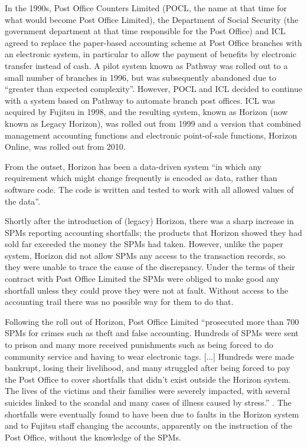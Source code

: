 In the 1990s, Post Office Counters Limited (POCL, the name at that time for what would become Post Office Limited), the Department of Social Security (the government department at that time responsible for the Post Office) and ICL agreed to replace the paper-based accounting scheme at Post Office branches with an electronic system, in particular to allow the payment of benefits by electronic transfer instead of cash. A pilot system known as Pathway was rolled out to a small number of branches in 1996, but was subsequently abandoned due to ``greater than expected complexity''. However, POCL and ICL decided to continue with a system based on Pathway to automate branch post offices. ICL was acquired by Fujitsu in 1998, and the resulting system, known as Horizon (now known as Legacy Horizon), was rolled out from 1999 and a version that combined management accounting functions and electronic point-of-sale functions, Horizon Online, was rolled out from 2010.

From the outset, Horizon has been a \gls{data-driven system} ``in which any requirement which
might change frequently is encoded as data, rather than software code. The code is
written and tested to work with all allowed values of the data''\cite{citation:bates_v_pol_tech}. 

Shortly after the introduction of (legacy) Horizon, there was a sharp increase in SPMs reporting accounting shortfalls; the products that Horizon showed they had sold far exceeded the money the SPMs had taken. However, unlike the paper system, Horizon did not allow SPMs any access to the transaction records, so they were unable to trace the cause of the discrepancy. Under the terms of their contract with Post Office Limited the SPMs were obliged to make good any shortfall unless they could prove they were not at fault. Without access to the accounting trail there was no possible way for them to do that.

Following the roll out of Horizon, Post Office Limited ``prosecuted more than 700 SPMs  for crimes such as theft and false accounting. Hundreds of SPMs were sent to prison and many more received punishments such as being forced to do community service and having to wear electronic tags. [...] Hundreds were made bankrupt, losing their livelihood, and many struggled after being forced to pay the Post Office to cover shortfalls that didn’t exist outside the Horizon system. The lives of the victims and their families were severely impacted, with several suicides linked to the scandal and many cases of illness caused by stress.'' \cite{citation:cw_horizon}. The shortfalls were eventually found to have been due to faults in the Horizon system and to Fujitsu staff changing the accounts, apparently on the instruction of the Post Office, without the knowledge of the SPMs.

